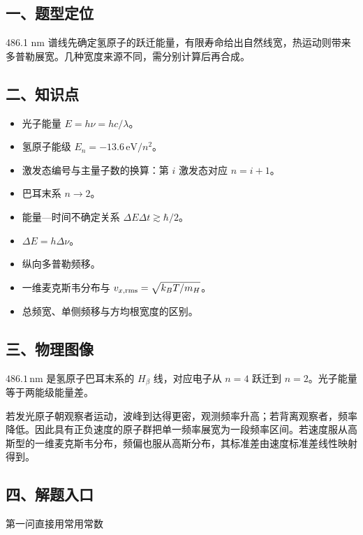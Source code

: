 \documentclass[12pt,a4paper,UTF8]{ctexart}
\newcommand{\tightlist}{\setlength{\itemsep}{0pt}\setlength{\parskip}{0pt}}
\begin{document}
\subsection{一、题型定位}\label{ux4e00ux9898ux578bux5b9aux4f4d-6}

486.1 nm
谱线先确定氢原子的跃迁能量，有限寿命给出自然线宽，热运动则带来多普勒展宽。几种宽度来源不同，需分别计算后再合成。

\subsection{二、知识点}\label{ux4e8cux77e5ux8bc6ux70b9-6}

\begin{itemize}
\tightlist
\item
  光子能量 \(E=h\nu=hc/\lambda\)。
\item
  氢原子能级 \(E_n=-13.6\,\mathrm{eV}/n^2\)。
\item
  激发态编号与主量子数的换算：第 \(i\) 激发态对应 \(n=i+1\)。
\item
  巴耳末系 \(n\to2\)。
\item
  能量---时间不确定关系 \(\Delta E\Delta t\gtrsim\hbar/2\)。
\item
  \(\Delta E=h\Delta\nu\)。
\item
  纵向多普勒频移。
\item
  一维麦克斯韦分布与 \(v_{x,\rm rms}=\sqrt{k_BT/m_H}\)。
\item
  总频宽、单侧频移与方均根宽度的区别。
\end{itemize}

\subsection{三、物理图像}\label{ux4e09ux7269ux7406ux56feux50cf-6}

\(486.1\,\mathrm{nm}\) 是氢原子巴耳末系的 \(H_\beta\) 线，对应电子从
\(n=4\) 跃迁到 \(n=2\)。光子能量等于两能级能量差。

若发光原子朝观察者运动，波峰到达得更密，观测频率升高；若背离观察者，频率降低。因此具有正负速度的原子群把单一频率展宽为一段频率区间。若速度服从高斯型的一维麦克斯韦分布，频偏也服从高斯分布，其标准差由速度标准差线性映射得到。

\subsection{四、解题入口}\label{ux56dbux89e3ux9898ux5165ux53e3-6}

第一问直接用常用常数
\end{document}
